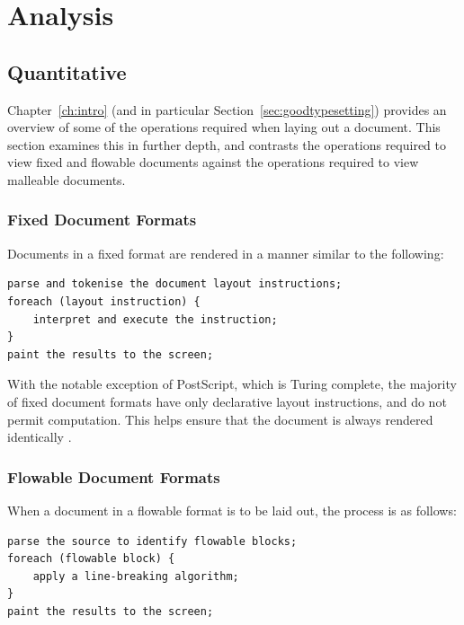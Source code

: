 \chapter{Analysis}\label{ch:analysis}



\section{Quantitative}

Chapter~\ref{ch:intro} (and in particular Section~\ref{sec:goodtypesetting}) provides an overview of some of the operations required when laying out a document. This section examines this in further depth, and contrasts the operations required to view fixed and flowable documents against the operations required to view malleable documents.

\subsection{Fixed Document Formats}
Documents in a fixed format are rendered in a manner similar to the following:
{\singlespacing
\begin{lstlisting}
parse and tokenise the document layout instructions;
foreach (layout instruction) {
    interpret and execute the instruction;
}
paint the results to the screen;
\end{lstlisting}
}
With the notable exception of PostScript, which is Turing complete, the majority of fixed document formats have only declarative layout instructions, and do not permit computation. This helps ensure that the document is always rendered identically \cite{Bagley2007}.

\subsection{Flowable Document Formats}

When a document in a flowable format is to be laid out, the process is as follows:
{\singlespacing
\begin{lstlisting}
parse the source to identify flowable blocks;
foreach (flowable block) {
    apply a line-breaking algorithm;
}
paint the results to the screen;
\end{lstlisting}
}

